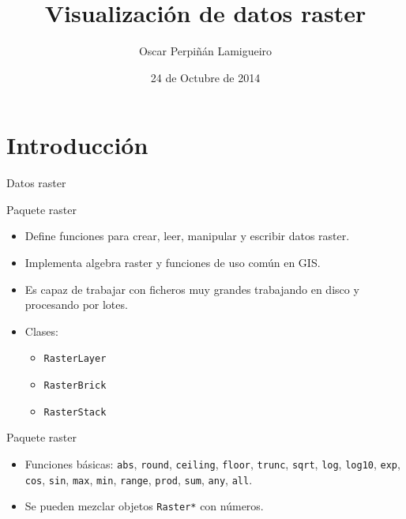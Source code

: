 \documentclass[xcolor={usenames,svgnames,dvipsnames}]{beamer}
\author{Oscar Perpiñán Lamigueiro}
\date{24 de Octubre de 2014}
\title{Visualización de datos raster}
\begin{document}
\maketitle

\section{Introducción}
\label{sec-1}

\begin{frame}[label=sec-1-1]{Datos raster}
\end{frame}
\begin{frame}[fragile,label=sec-1-2]{Paquete raster}
 \begin{itemize}
\item Define funciones para crear, leer, manipular y escribir datos raster.
\item Implementa algebra raster y funciones de uso común en GIS.
\item Es capaz de trabajar con ficheros muy grandes trabajando en disco y procesando por lotes.
\item Clases:
\begin{itemize}
\item \texttt{RasterLayer}
\item \texttt{RasterBrick}
\item \texttt{RasterStack}
\end{itemize}
\end{itemize}
\end{frame}

\begin{frame}[fragile,label=sec-1-3]{Paquete raster}
 \begin{itemize}
\item Funciones básicas: \texttt{abs}, \texttt{round}, \texttt{ceiling}, \texttt{floor}, \texttt{trunc},
\texttt{sqrt}, \texttt{log}, \texttt{log10}, \texttt{exp}, \texttt{cos}, \texttt{sin}, \texttt{max}, \texttt{min}, \texttt{range},
\texttt{prod}, \texttt{sum}, \texttt{any}, \texttt{all}.
\item Se pueden mezclar objetos \texttt{Raster*} con números.
\end{itemize}
\end{frame}
\end{document}
